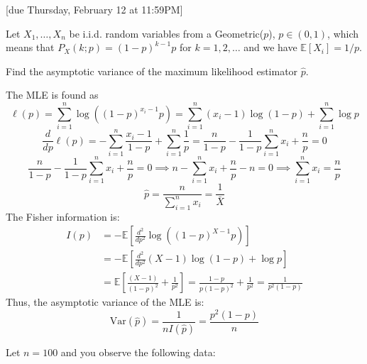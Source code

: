 \documentclass{article}
\newcommand{\E}{\mathbb{E}}
\newcommand{\V}{\text{Var}}
\begin{document}
[due Thursday, February 12 at 11:59PM]

\begin{probset}

\begin{prob}
    Let $X_1, \dots , X_n$ be i.i.d. random variables from a Geometric($p$), $p \in (0, 1)$, which means that $P_X (k; p) = (1 - p)^{k-1}p$ for $k = 1, 2, \dots$ and we have $\E[X_i] = 1/p$.

    \begin{subprobset}
    \begin{subprob}
        Find the asymptotic variance of the maximum likelihood estimator $\hat{p}$.

        \begin{soln}
            The MLE is found as 
            \[
                \ell(p) = \sum_{i=1}^n \log \left( (1 - p)^{x_i - 1} p \right) = \sum_{i=1}^n (x_i - 1) \log(1 - p) + \sum_{i=1}^n \log p
            \]
            \[
                \frac{d}{dp} \ell(p) = -\sum_{i=1}^n \frac{x_i - 1}{1 - p} + \sum_{i=1}^n \frac{1}{p} = \frac{n}{1-p} - \frac{1}{1-p}\sum_{i=1}^n x_i + \frac{n}{p} = 0
            \]
            \[
                \frac{n}{1-p} - \frac{1}{1-p}\sum_{i=1}^n x_i + \frac{n}{p} = 0 \implies n - \sum_{i=1}^n x_i + \frac{n}{p} - n = 0 \implies \sum_{i=1}^n x_i = \frac{n}{p}
            \]
            \[
                \hat{p} = \frac{n}{\sum_{i=1}^n x_i} = \frac{1}{\bar{X}}
            \]
            The Fisher information is:
            \begin{align*}
                I(p) &= -\E\left[\frac{d^2}{dp^2} \log \left( (1 - p)^{X - 1} p \right) \right] \\
                &= -\E\left[\frac{d^2}{dp^2} (X - 1) \log(1 - p) + \log p \right] \\
                &= \E\left[\frac{(X - 1)}{(1 - p)^2} + \frac{1}{p^2} \right] = \frac{1 - p}{p(1 - p)^2} + \frac{1}{p^2} = \frac{1}{p^2(1-p)}
            \end{align*}
            Thus, the asymptotic variance of the MLE is:
            \[
                \V(\hat{p}) = \frac{1}{nI(\hat{p})} = \frac{p^2(1-p)}{n}
            \]
        \end{soln}
    \end{subprob}

    \begin{subprob}
        Let $n = 100$ and you observe the following data:
        

\end{subprob}
\end{subprobset}
\end{prob}
\end{probset}
\end{document}
